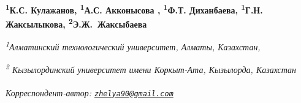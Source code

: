 
\begin{articleheader}

{\bfseries
\textsuperscript{1}К.С. Кулажанов\authorid,
\textsuperscript{1}А.С. Акконысова\textsuperscript{\envelope } \authorid,
\textsuperscript{1}Ф.Т. Диханбаева\authorid,
\textsuperscript{1}Г.Н. Жаксылыкова\authorid,
\textsuperscript{2}Э.Ж.~Жаксыбаева\authorid}
\end{articleheader}

\begin{affiliation}
\emph{\textsuperscript{1}Алматинский технологический университет, Алматы, Казахстан,}

\emph{\textsuperscript{2} Кызылординский университет имени Коркыт-Ата, Кызылорда, Казахстан}

\raggedright \textsuperscript{\envelope }{\em Корреспондент-автор: \href{mailto:zhelya90@gmail.com}{\nolinkurl{zhelya90@gmail.com}}}
\end{affiliation}

